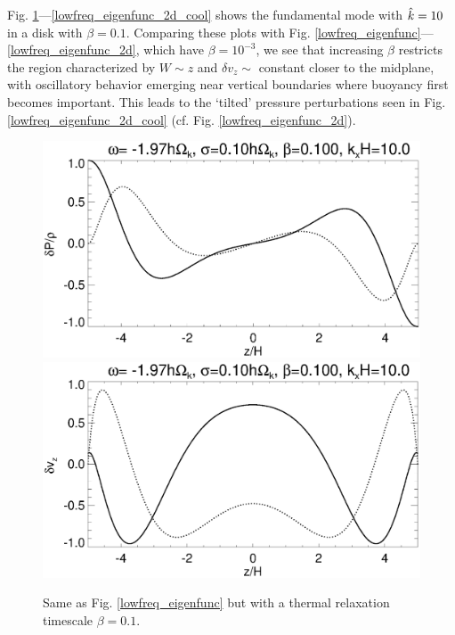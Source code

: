 Fig. \ref{lowfreq_eigenfunc_cool}---\ref{lowfreq_eigenfunc_2d_cool}
shows the fundamental mode with $\hat{k}=10$ in a disk with 
$\beta=0.1$. Comparing these plots with
Fig. \ref{lowfreq_eigenfunc}---\ref{lowfreq_eigenfunc_2d}, which have
$\beta=10^{-3}$, we see that increasing $\beta$ restricts the region 
characterized by $W\sim z$ and $\delta v_z\sim$ constant closer to the
midplane, with oscillatory behavior emerging near vertical boundaries
where buoyancy first becomes important. This leads to the `tilted'
pressure perturbations seen in Fig. \ref{lowfreq_eigenfunc_2d_cool} 
(cf. Fig. \ref{lowfreq_eigenfunc_2d}). 

\begin{figure}
  \includegraphics[width=\linewidth,clip=true,trim=0cm 1.75cm 0cm
  0cm]{figures/eigenvectorW_beta0d1} 
  \includegraphics[width=\linewidth,clip=true,trim=0cm 0cm 0cm
  1cm]{figures/eigenvectorvz_beta0d1}
  \caption{Same as Fig. \ref{lowfreq_eigenfunc} but with a
    thermal relaxation timescale $\beta=0.1$. 
    \label{lowfreq_eigenfunc_cool}
  }
\end{figure}

